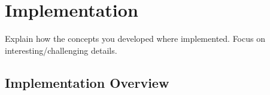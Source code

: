 \chapter{Implementation}
\label{chap:implementation}
Explain how the concepts you developed where implemented. Focus on interesting/challenging details.

\section{Implementation Overview}
\label{sec:implementationOverview}
\blindtext